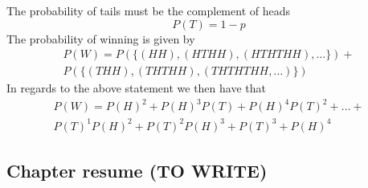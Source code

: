 The probability of tails must be the complement of heads
\[
    P(T)=1-p
\]
The probability of winning is given by
\begin{equation*}
  \begin{gathered}
    P(W)=P(\{(HH),(HTHH),(HTHTHH),\ldots\})+ \\
    P(\{(THH),(THTHH),(THTHTHH,\ldots)\})
  \end{gathered}
\end{equation*}
In regards to the above statement we then have that
\begin{equation*}
  \begin{gathered}
    P(W)=P(H)^{2}+P(H)^{3}P(T)+P(H)^{4}P(T)^{2}+\ldots+ \\
    P(T)^{1}P(H)^{2}+P(T)^{2}P(H)^{3}+P(T)^{3}+P(H)^{4}
  \end{gathered}
\end{equation*}
\subsection{Chapter resume (TO WRITE)}
